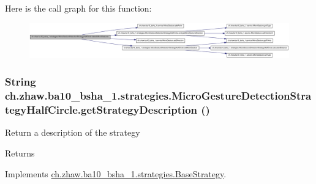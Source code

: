 Here is the call graph for this function:\nopagebreak
\begin{figure}[H]
\begin{center}
\leavevmode
\includegraphics[width=420pt]{classch_1_1zhaw_1_1ba10__bsha__1_1_1strategies_1_1MicroGestureDetectionStrategyHalfCircle_a780f7ded471f8e1dbd141518c41c060e_cgraph}
\end{center}
\end{figure}
\hypertarget{classch_1_1zhaw_1_1ba10__bsha__1_1_1strategies_1_1MicroGestureDetectionStrategyHalfCircle_afc528d2770f7e921c54321cdf8e82df3}{
\subsubsection[{getStrategyDescription}]{\setlength{\rightskip}{0pt plus 5cm}String ch.zhaw.ba10\_\-bsha\_\-1.strategies.MicroGestureDetectionStrategyHalfCircle.getStrategyDescription ()}}
\label{classch_1_1zhaw_1_1ba10__bsha__1_1_1strategies_1_1MicroGestureDetectionStrategyHalfCircle_afc528d2770f7e921c54321cdf8e82df3}
Return a description of the strategy

\begin{DoxyReturn}{Returns}

\end{DoxyReturn}


Implements \hyperlink{classch_1_1zhaw_1_1ba10__bsha__1_1_1strategies_1_1BaseStrategy_a75fdb36932ad701f6375cc1fe718056b}{ch.zhaw.ba10\_\-bsha\_\-1.strategies.BaseStrategy}.

